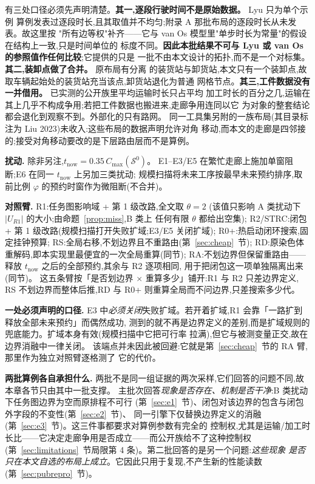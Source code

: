 \documentclass[manuscript,screen,review]{acmart}
\providecommand{\STRC}{\textsc{STRC}}
\begin{document}
有三处口径必须先声明清楚。\textbf{其一,逐段行驶时间不是原始数据。} Lyu 只为单个示例
算例发表过逐段时长,且其取值并不均匀;附录 A 那批布局的逐段时长从未发表。故这里按
"所有边等权"补齐——它与 van Os 模型里"单步时长为常量"的假设在结构上一致,只是时间单位的
标度不同。\textbf{因此本批结果不可与 Lyu 或 van Os 的参照值作任何比较};它提供的只是
一批不由本文设计的拓扑,而不是一个对标集。\textbf{其二,装卸点做了合并。} 原布局有分离
的装货站与卸货站,本文只有一个装卸点,故取车辆起始处的装货站充当该点,卸货站退化为普通
网格节点。\textbf{其三,工件数据没有一并借用。} 已实测的公开族里平均运输时长只占平均
加工时长的百分之几,运输在其上几乎不构成争用;若把工件数据也搬进来,走廊争用连同以它
为对象的整套结论都会退化到观察不到。外部化的只有路网。
同一工具集另附的一族布局(其目录标注为 Liu 2023)未收入:这些布局的数据声明允许对角
移动,而本文的走廊是四邻接的;接受对角移动要改的是下层路由层而不是算例。

\textbf{扰动.}
除非另注,\(t_{\mathrm{now}}=0.35\,C_{\max}(\mathcal{S}^0)\)。
E1--E3/E5 在繁忙走廊上施加单窗阻断;E6 在同一 \(t_{\mathrm{now}}\) 上另加三类扰动;
规模扫描将未来工序按最早未来预约排序,取前比例 \(\varphi\) 的预约时窗作为微阻断(不合并)。

\textbf{对照臂.}
R1:任务图影响域 + 第 1 级改路,全文取 \(\theta=2\)
(该值只影响 A 类扰动下 \(|U_{R1}|\) 的大小;由命题~\ref{prop:miss},B 类上
任何有限 \(\theta\) 都给出空集);
R2/\STRC:闭包 + 第 1 级改路(规模扫描打开失败扩域;E3/E5 关闭扩域);
R0+:热启动闭环搜索,固定挂钟预算;
RS:全局右移,不划边界且不重路由(第~\ref{sec:cheap}~节);
RD:原染色体重解码,即本实现里最便宜的一次全局重算(同节);
RA:不划边界但保留重路由——释放 \(t_{\mathrm{now}}\) 之后的全部预约,其余与 R2 逐项相同,
用于把闭包这一项单独隔离出来(同节)。
这五条臂按「是否划边界 \(\times\) 重算多少」铺开:R1 与 R2 只差边界定义,
RS 不划边界而整体后推,RD 与 R0+ 则重算全局而不问边界,只差搜索多少代。

\textbf{一处必须声明的口径.}
E3 中\emph{必须关闭}失败扩域。若开着扩域,R1 会靠「一路扩到释放全部未来预约」而偶然成功,
测到的就不再是边界定义的差别,而是扩域规则的兜底能力。扩域本身有效(规模扫描中它把可行率
拉满),但它与被测变量正交,故在边界消融中一律关闭。
该端点并未因此被回避:它就是第~\ref{sec:cheap}~节的 RA 臂,那里作为独立对照臂逐格测了
它的代价。

\textbf{两批算例各自承担什么.}
两批不是同一组证据的两次采样,它们回答的问题不同,故本章各节只由其中一批支撑。
主批次回答\emph{现象是否存在、机制是否干净}:B 类扰动下任务图边界为空而原排程不可行
(第~\ref{sec:e1}~节)、闭包对该边界的包含与闭包外字段的不变性(第~\ref{sec:e2}~节)、
同一引擎下仅替换边界定义的消融(第~\ref{sec:e3}~节)。这三件事都要求对算例参数有完全的
控制权,尤其是运输/加工时长比——它决定走廊争用是否成立——而公开族给不了这种控制权
(第~\ref{sec:limitations}~节局限第 4 条)。第二批回答的是另一个问题:\emph{这些现象
是否只在本文自选的布局上成立}。它因此只用于复现,不产生新的性能读数
(第~\ref{sec:pubrepro}~节)。
\end{document}
